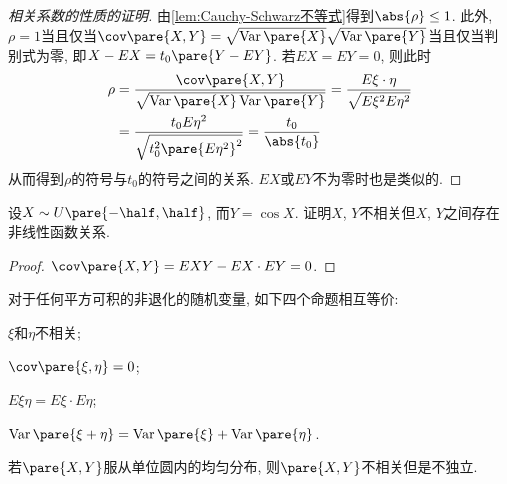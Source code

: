 \documentclass{ctexart}
\DeclareMathOperator{\Var}{Var}
\begin{document}
\begin{proof}[相关系数的性质的证明]
    由\cref{lem:Cauchy-Schwarz不等式}得到$\abs{\rho}\le 1$. 此外, $\rho = 1$当且仅当$\cov\pare{X,Y} = \sqrt{\Var\pare{X}}\sqrt{\Var\pare{Y}}$当且仅当判别式为零, 即$X-EX = t_0 \pare{Y-EY}$. 若$EX=EY= 0$, 则此时
    \begin{align*}
        \rho &= \frac{\cov\pare{X,Y}}{\sqrt{\Var\pare{X}\Var\pare{Y}}} = \frac{E\xi\cdot\eta}{\sqrt{E\xi^2 E\eta^2}} \\
        &= \frac{t_0 E\eta^2}{\sqrt{t_0^2\pare{E\eta^2}^2}} = \frac{t_0}{\abs{t_0}}
    \end{align*}
    从而得到$\rho$的符号与$t_0$的符号之间的关系. $EX$或$EY$不为零时也是类似的.
\end{proof}
\begin{sample}
    \begin{ex}
        设$X \sim \displaystyle U\pare{-\half, \half}$, 而$Y = \cos X$. 证明$X$, $Y$不相关但$X$, $Y$之间存在非线性函数关系.
    \end{ex}
    \begin{proof}
        $\displaystyle \cov\pare{X,Y} = EXY - EX\cdot EY = 0$.
    \end{proof}
\end{sample}
\begin{theorem}
    对于任何平方可积的非退化的随机变量, 如下四个命题相互等价:
    \begin{cenum}
        \item $\xi$和$\eta$不相关;
        \item $\cov\pare{\xi,\eta} = 0$;
        \item $E\xi \eta = E\xi \cdot E\eta$;
        \item $\Var\pare{\xi + \eta}  = \Var\pare{\xi} + \Var\pare{\eta}$.
    \end{cenum}
\end{theorem}
\begin{sample}
    \begin{ex}
        若$\pare{X,Y}$服从单位圆内的均匀分布, 则$\pare{X,Y}$不相关但是不独立.
    \end{ex}
\end{sample}
\end{document}
